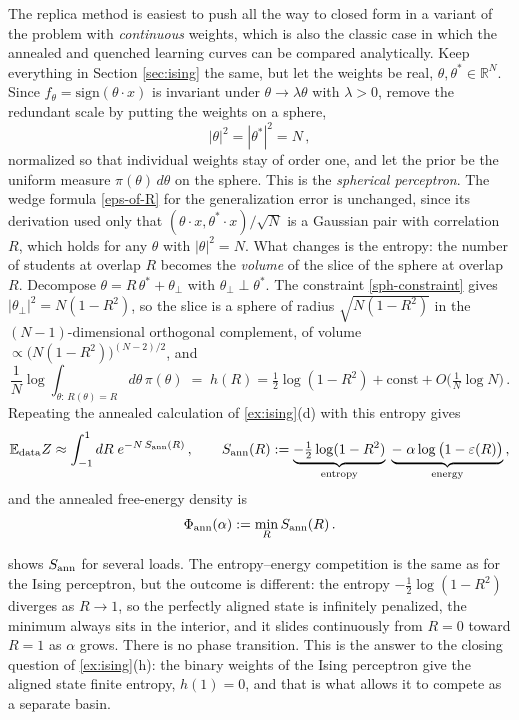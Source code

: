 \documentclass[11pt]{article}
\newcommand{\R}{\mathbb{R}}
\newcommand{\E}{\mathbb{E}}
\begin{document}
The replica method is easiest to push all the way to closed form in a variant of the problem with \emph{continuous} weights, which is also the classic case in which the annealed and quenched learning curves can be compared analytically. Keep everything in Section \ref{sec:ising} the same, but let the weights be real, $\theta,\theta^*\in\R^N$. Since $f_\theta = \mathrm{sign}(\theta\cdot x)$ is invariant under $\theta\to\lambda\theta$ with $\lambda>0$, remove the redundant scale by putting the weights on a sphere,
%
\begin{equation}
    |\theta|^2 = |\theta^*|^2 = N\,, \label{sph-constraint}
\end{equation}
%
normalized so that individual weights stay of order one, and let the prior be the uniform measure $\pi(\theta)\,d\theta$ on the sphere. This is the \emph{spherical perceptron}. The wedge formula \eqref{eps-of-R} for the generalization error is unchanged, since its derivation used only that $(\theta\cdot x,\theta^*\cdot x)/\sqrt N$ is a Gaussian pair with correlation $R$, which holds for any $\theta$ with $|\theta|^2 = N$. What changes is the entropy: the number of students at overlap $R$ becomes the \emph{volume} of the slice of the sphere at overlap $R$. Decompose $\theta = R\,\theta^* + \theta_\perp$ with $\theta_\perp\perp\theta^*$. The constraint \eqref{sph-constraint} gives $|\theta_\perp|^2 = N(1-R^2)$, so the slice is a sphere of radius $\sqrt{N(1-R^2)}$ in the $(N-1)$-dimensional orthogonal complement, of volume $\propto\big(N(1-R^2)\big)^{(N-2)/2}$, and
%
\begin{equation}
    \frac{1}{N}\log\int_{\theta:\,R(\theta)=R}d\theta\,\pi(\theta) \;=\; h(R) = \tfrac{1}{2}\log(1-R^2) + \text{const} + O\big(\tfrac{1}{N}\log N\big)\,. \label{coarea}
\end{equation}
%
Repeating the annealed calculation of \cref{ex:ising}(d) with this entropy gives
%
\begin{equation}
    \E_{\rm data}Z \approx \int_{-1}^1 dR\; e^{-N\,S_{\rm ann}(R)}\,,\qquad
    S_{\rm ann}(R) := \underbrace{-\tfrac{1}{2}\log(1-R^2)}_{\text{entropy}}\;\underbrace{-\;\alpha\log\big(1-\varepsilon(R)\big)}_{\text{energy}}\,, \label{annealed-integral}
\end{equation}
%
and the annealed free-energy density is
%
\begin{equation}
    \Phi_{\rm ann}(\alpha) := \min_R S_{\rm ann}(R)\,. \label{annealed-saddle}
\end{equation}

 shows $S_{\rm ann}$ for several loads. The entropy--energy competition is the same as for the Ising perceptron, but the outcome is different: the entropy $-\frac{1}{2}\log(1-R^2)$ diverges as $R\to1$, so the perfectly aligned state is infinitely penalized, the minimum always sits in the interior, and it slides continuously from $R=0$ toward $R=1$ as $\alpha$ grows. There is no phase transition. This is the answer to the closing question of \cref{ex:ising}(h): the binary weights of the Ising perceptron give the aligned state finite entropy, $h(1)=0$, and that is what allows it to compete as a separate basin.
\end{document}

